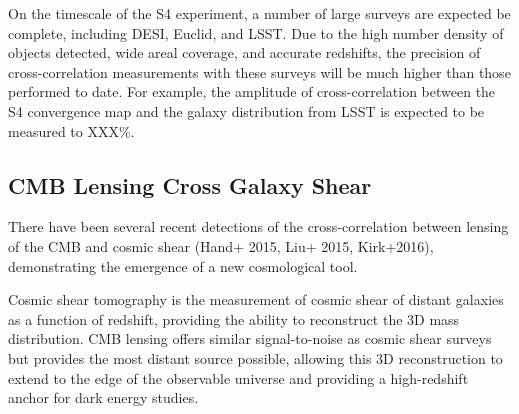 On the timescale of the S4 experiment, a number of large surveys are expected be complete, including DESI, Euclid, and LSST.  Due to the high number density of objects detected, wide areal coverage, and accurate redshifts, the precision of cross-correlation measurements with these surveys will be much higher than those performed to date.  For example, the amplitude of cross-correlation between the S4 convergence map and the galaxy distribution from LSST is expected to be measured to XXX\%.  



\subsection{CMB Lensing Cross Galaxy Shear}


There have been several recent detections of the cross-correlation between lensing of the CMB and cosmic shear (Hand+ 2015, Liu+ 2015, Kirk+2016), demonstrating the emergence of a new cosmological tool. 

Cosmic shear tomography is the measurement of cosmic shear of distant galaxies as a function of redshift, providing the ability to reconstruct the 3D mass distribution. CMB lensing offers similar signal-to-noise as cosmic shear surveys but provides the most distant source possible, allowing this 3D reconstruction to extend to the edge of the observable universe and providing a high-redshift anchor for dark energy studies.

